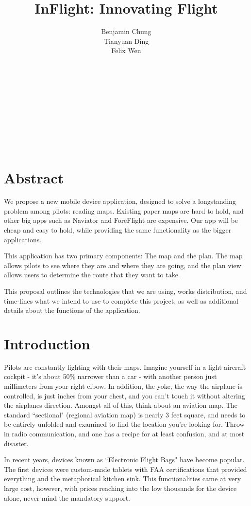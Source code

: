 \documentclass[10pt,a4paper]{article}
\author{Benjamin Chung\\ Tianyuan Ding\\ Felix Wen}
\title{\textbf{InFlight: Innovating Flight}}
\begin{document}
\maketitle
\emph{\\\\\\\\\\\\\\}
\section*{Abstract}
We propose a new mobile device application, designed to solve a longstanding problem among pilots: reading maps. Existing paper maps are hard to hold, and other big apps such as Naviator and ForeFlight are expensive. Our app will be cheap and easy to hold, while providing the same functionality as the bigger applications.

This application has two primary components: The map and the plan. The map allows pilots to see where they are and where they are going, and the plan view allows users to determine the route that they want to take.

This proposal outlines the technologies that we are using, works distribution, and time-lines what we intend to use to complete this project, as well as additional details about the functions of the application.\newpage
\tableofcontents
\newpage
\section{Introduction}
Pilots are constantly fighting with their maps. Imagine yourself in a light aircraft cockpit - it's about 50\% narrower than a car - with another person just millimeters from your right elbow. In addition, the yoke, the way the airplane is controlled, is just inches from your chest, and you can't touch it without altering the airplanes direction. Amongst all of this, think about an aviation map. The standard ``sectional" (regional aviation map) is nearly 3 feet square, and needs to be entirely unfolded and examined to find the location you're looking for. Throw in radio communication, and one has a recipe for at least confusion, and at most disaster. 

In recent years, devices known as ``Electronic Flight Bags" have become popular. The first devices were custom-made tablets with FAA certifications that provided everything and the metaphorical kitchen sink. This functionalities came at very large cost, however, with prices reaching into the low thousands for the device alone, never mind the mandatory support.
\end{document}
